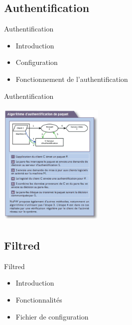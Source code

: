 \documentclass[t,12pt]{beamer}
\begin{document}
	  \subsection{Authentification}
	  \begin{frame}{Authentification}                                                         %
	      \begin{itemize}                                                 %
		\item Introduction
		\newline
		\item Configuration
		 \newline
		\item Fonctionnement de l'authentification
	  \end{itemize}
	  \end{frame} 


	  \begin{frame}{Authentification}                                                         %
		  \begin{center}\includegraphics[width=5cm,height=6cm]{images/auth.png}\end{center}
	  \end{frame} 

	  \subsection{Filtred}
	  \begin{frame}{Filtred}                                                         %
	      \begin{itemize}                                                   %
		\item Introduction
		\newline
		\item Fonctionnalités
		\newline
		\item Fichier de configuration
	  \end{itemize}
	  \end{frame} 
\end{document}
